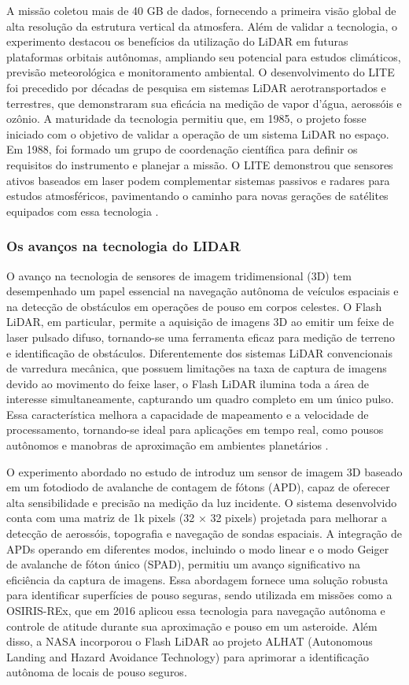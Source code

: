 A missão coletou mais de 40 GB de dados, fornecendo a primeira visão global de alta resolução da estrutura vertical da atmosfera. Além de validar a tecnologia, o experimento destacou os benefícios da utilização do LiDAR em futuras plataformas orbitais autônomas, ampliando seu potencial para estudos climáticos, previsão meteorológica e monitoramento ambiental. O desenvolvimento do LITE foi precedido por décadas de pesquisa em sistemas LiDAR aerotransportados e terrestres, que demonstraram sua eficácia na medição de vapor d'água, aerossóis e ozônio. A maturidade da tecnologia permitiu que, em 1985, o projeto fosse iniciado com o objetivo de validar a operação de um sistema LiDAR no espaço. Em 1988, foi formado um grupo de coordenação científica para definir os requisitos do instrumento e planejar a missão. O LITE demonstrou que sensores ativos baseados em laser podem complementar sistemas passivos e radares para estudos atmosféricos, pavimentando o caminho para novas gerações de satélites equipados com essa tecnologia \citep{winker1996}.

\subsubsection{Os avanços na tecnologia do LIDAR}

O avanço na tecnologia de sensores de imagem tridimensional (3D) tem desempenhado um papel essencial na navegação autônoma de veículos espaciais e na detecção de obstáculos em operações de pouso em corpos celestes. O Flash LiDAR, em particular, permite a aquisição de imagens 3D ao emitir um feixe de laser pulsado difuso, tornando-se uma ferramenta eficaz para medição de terreno e identificação de obstáculos. Diferentemente dos sistemas LiDAR convencionais de varredura mecânica, que possuem limitações na taxa de captura de imagens devido ao movimento do feixe laser, o Flash LiDAR ilumina toda a área de interesse simultaneamente, capturando um quadro completo em um único pulso. Essa característica melhora a capacidade de mapeamento e a velocidade de processamento, tornando-se ideal para aplicações em tempo real, como pousos autônomos e manobras de aproximação em ambientes planetários \citep{mizuno2020}.

O experimento abordado no estudo de \citep{mizuno2020} introduz um sensor de imagem 3D baseado em um fotodiodo de avalanche de contagem de fótons (APD), capaz de oferecer alta sensibilidade e precisão na medição da luz incidente. O sistema desenvolvido conta com uma matriz de 1k pixels (32 × 32 pixels) projetada para melhorar a detecção de aerossóis, topografia e navegação de sondas espaciais. A integração de APDs operando em diferentes modos, incluindo o modo linear e o modo Geiger de avalanche de fóton único (SPAD), permitiu um avanço significativo na eficiência da captura de imagens. Essa abordagem fornece uma solução robusta para identificar superfícies de pouso seguras, sendo utilizada em missões como a OSIRIS-REx, que em 2016 aplicou essa tecnologia para navegação autônoma e controle de atitude durante sua aproximação e pouso em um asteroide. Além disso, a NASA incorporou o Flash LiDAR ao projeto ALHAT (Autonomous Landing and Hazard Avoidance Technology) para aprimorar a identificação autônoma de locais de pouso seguros.

